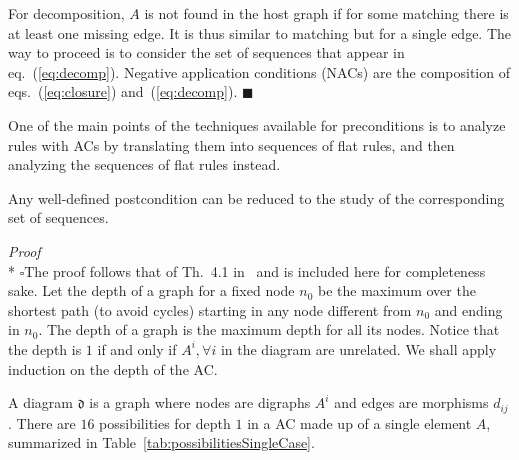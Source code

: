 \documentclass{fundam}
\newcommand{\proofend}{\hfill$\blacksquare$}
\begin{document}
For decomposition, $A$ is not found in the host graph if for some
matching there is at least one missing edge. It is thus similar to
matching but for a single edge. The way to proceed is to consider the
set of sequences that appear in eq.~(\ref{eq:decomp}). Negative
application conditions (NACs) are the composition of
eqs.~(\ref{eq:closure}) and~(\ref{eq:decomp}). \proofend

One of the main points of the techniques available for preconditions
is to analyze rules with ACs by translating them into sequences of
flat rules, and then analyzing the sequences of flat rules instead.

\begin{theorem}
  \label{th:reductionPost}
  Any well-defined postcondition can be reduced to the study of
  the corresponding set of sequences.
\end{theorem}

\noindent \emph{Proof} \\*
$\square$The proof follows that of Th.~4.1 in~\cite{MGGfundamenta} and
is included here for completeness sake. Let the depth of a graph for a
fixed node $n_0$ be the maximum over the shortest path (to avoid
cycles) starting in any node different from $n_0$ and ending in
$n_0$. The depth of a graph is the maximum depth for all its
nodes. Notice that the depth is $1$ if and only if $A^i, \forall i$ in
the diagram are unrelated. We shall apply induction on the depth of
the AC.

A diagram $\mathfrak{d}$ is a graph where nodes are digraphs $A^i$ and
edges are morphisms $d_{ij}$. There are $16$ possibilities for depth
$1$ in a AC made up of a single element $A$, summarized in
Table~\ref{tab:possibilitiesSingleCase}.
\end{document}
